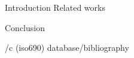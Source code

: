 
\draft     %


\makefront

\chap Introduction
\chap Related works






\chap Conclusion

\bibchap
\usebib/c (iso690) database/bibliography




\bye
